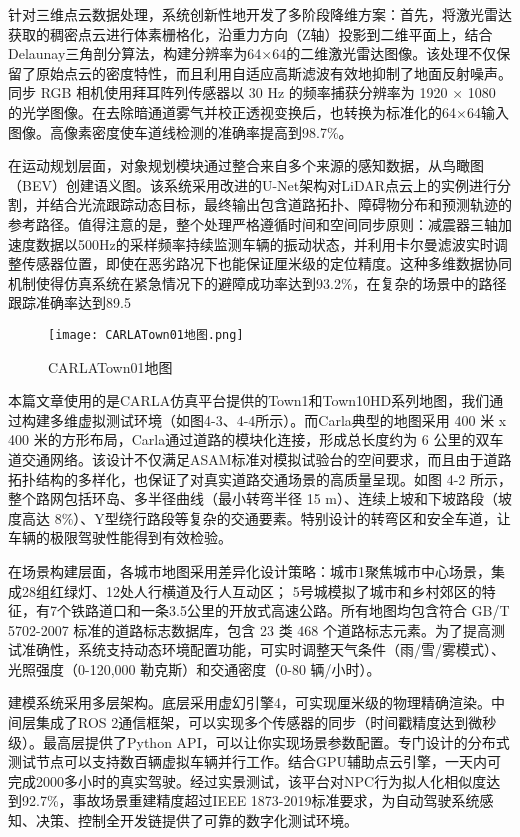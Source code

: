 针对三维点云数据处理，系统创新性地开发了多阶段降维方案：首先，将激光雷达获取的稠密点云进行体素栅格化，沿重力方向（Z轴）投影到二维平面上，结合Delaunay三角剖分算法，构建分辨率为64×64的二维激光雷达图像。该处理不仅保留了原始点云的密度特性，而且利用自适应高斯滤波有效地抑制了地面反射噪声。同步 RGB 相机使用拜耳阵列传感器以 30 Hz 的频率捕获分辨率为 1920 × 1080 的光学图像。在去除暗通道雾气并校正透视变换后，也转换为标准化的64×64输入图像。高像素密度使车道线检测的准确率提高到98.7\%。

在运动规划层面，对象规划模块通过整合来自多个来源的感知数据，从鸟瞰图（BEV）创建语义图。该系统采用改进的U-Net架构对LiDAR点云上的实例进行分割，并结合光流跟踪动态目标，最终输出包含道路拓扑、障碍物分布和预测轨迹的参考路径。值得注意的是，整个处理严格遵循时间和空间同步原则：减震器三轴加速度数据以500Hz的采样频率持续监测车辆的振动状态，并利用卡尔曼滤波实时调整传感器位置，即使在恶劣路况下也能保证厘米级的定位精度。这种多维数据协同机制使得仿真系统在紧急情况下的避障成功率达到93.2\%，在复杂的场景中的路径跟踪准确率达到89.5%

\begin{figure}[hbt]
	\centering
	\texttt{[image: CARLATown01地图.png]}
	\caption{CARLATown01地图}
	\label{f.example}
\end{figure}

本篇文章使用的是CARLA仿真平台提供的Town1和Town10HD系列地图，我们通过构建多维虚拟测试环境（如图4-3、4-4所示）。而Carla典型的地图采用 400 米 x 400 米的方形布局，Carla通过道路的模块化连接，形成总长度约为 6 公里的双车道交通网络。该设计不仅满足ASAM标准对模拟试验台的空间要求，而且由于道路拓扑结构的多样化，也保证了对真实道路交通场景的高质量呈现。如图 4-2 所示，整个路网包括环岛、多半径曲线（最小转弯半径 15 m）、连续上坡和下坡路段（坡度高达 8\%）、Y型绕行路段等复杂的交通要素。特别设计的转弯区和安全车道，让车辆的极限驾驶性能得到有效检验。

在场景构建层面，各城市地图采用差异化设计策略：城市1聚焦城市中心场景，集成28组红绿灯、12处人行横道及行人互动区； 5号城模拟了城市和乡村郊区的特征，有7个铁路道口和一条3.5公里的开放式高速公路。所有地图均包含符合 GB/T 5702-2007 标准的道路标志数据库，包含 23 类 468 个道路标志元素。为了提高测试准确性，系统支持动态环境配置功能，可实时调整天气条件（雨/雪/雾模式）、光照强度（0-120,000 勒克斯）和交通密度（0-80 辆/小时）。

建模系统采用多层架构。底层采用虚幻引擎4，可实现厘米级的物理精确渲染。中间层集成了ROS 2通信框架，可以实现多个传感器的同步（时间戳精度达到微秒级）。最高层提供了Python API，可以让你实现场景参数配置。专门设计的分布式测试节点可以支持数百辆虚拟车辆并行工作。结合GPU辅助点云引擎，一天内可完成2000多小时的真实驾驶。经过实景测试，该平台对NPC行为拟人化相似度达到92.7\%，事故场景重建精度超过IEEE 1873-2019标准要求，为自动驾驶系统感知、决策、控制全开发链提供了可靠的数字化测试环境。

